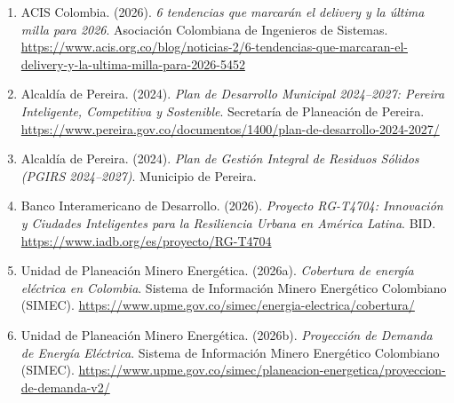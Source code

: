 \documentclass[11pt,a4paper]{article}
\begin{document}
\begin{enumerate}[leftmargin=2.0em, labelindent=0pt]
    \item ACIS Colombia. (2026). \textit{6 tendencias que marcarán el delivery y la última milla para 2026}. Asociación Colombiana de Ingenieros de Sistemas. \url{https://www.acis.org.co/blog/noticias-2/6-tendencias-que-marcaran-el-delivery-y-la-ultima-milla-para-2026-5452}

    \item Alcaldía de Pereira. (2024). \textit{Plan de Desarrollo Municipal 2024--2027: Pereira Inteligente, Competitiva y Sostenible}. Secretaría de Planeación de Pereira. \url{https://www.pereira.gov.co/documentos/1400/plan-de-desarrollo-2024-2027/}

    \item Alcaldía de Pereira. (2024). \textit{Plan de Gestión Integral de Residuos Sólidos (PGIRS 2024--2027)}. Municipio de Pereira.

    \item Banco Interamericano de Desarrollo. (2026). \textit{Proyecto RG-T4704: Innovación y Ciudades Inteligentes para la Resiliencia Urbana en América Latina}. BID. \url{https://www.iadb.org/es/proyecto/RG-T4704}

    \item Unidad de Planeación Minero Energética. (2026a). \textit{Cobertura de energía eléctrica en Colombia}. Sistema de Información Minero Energético Colombiano (SIMEC). \url{https://www.upme.gov.co/simec/energia-electrica/cobertura/}

    \item Unidad de Planeación Minero Energética. (2026b). \textit{Proyección de Demanda de Energía Eléctrica}. Sistema de Información Minero Energético Colombiano (SIMEC). \url{https://www.upme.gov.co/simec/planeacion-energetica/proyeccion-de-demanda-v2/}
\end{enumerate}
\end{document}
